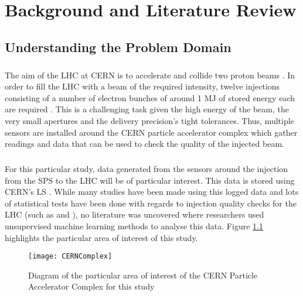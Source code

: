 \chapter{Background and Literature Review}
\section{Understanding the Problem Domain}
\paragraph{ }The aim of the \ac{LHC} at \acs{CERN} is to accelerate and collide two proton beams \cite{Valentino2017}. In order to fill the \acs{LHC} with a beam of the required intensity, twelve injections consisting of a number of electron bunches of around 1 \acs{MJ} of stored energy each are required \cite{Drosdal2011}. This is a challenging task given the high energy of the beam, the very small apertures and the delivery precision's tight tolerances. Thus, multiple sensors are installed around the \acs{CERN} particle accelerator complex \cite{Lefevre2008} which gather readings and data that can be used to check the quality of the injected beam. 

\paragraph{ }  For this particular study, data generated from the sensors around the injection from the \acs{SPS} to the \acs{LHC} will be of particular interest. This data is stored using \acs{CERN}'s \ac{LS} \cite{Roderick2013}. While many studies have been made using this logged data and lots of statistical tests have been done with regards to injection quality checks for the \acs{LHC} (such as \cite{Drosdal2011} and \cite{Kain2010}), no literature was uncovered where researchers used unsupervised machine learning methods to analyse this data. Figure \ref{fig::SPStoLHCInjection} highlights the particular area of interest of this study.


\begin{figure}[t]
	\centering
	\texttt{[image: CERNComplex]}
	\caption[The CERN Particle Accelerator Complex]{Diagram of the particular area of interest of the CERN Particle Accelerator Complex for this study}
	\label{fig::SPStoLHCInjection}
\end{figure}


